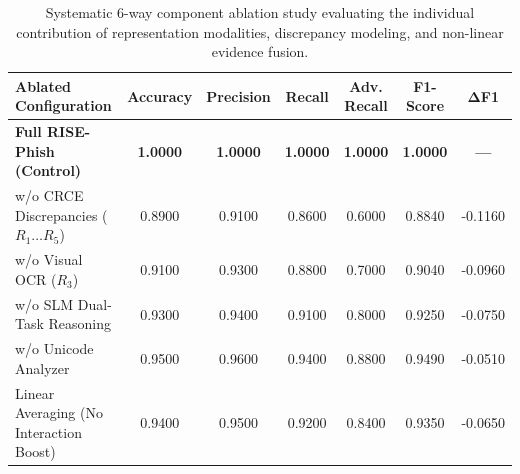\documentclass{article}
\begin{document}
\begin{table}[t]
\centering
\small
\caption{Systematic 6-way component ablation study evaluating the individual contribution of representation modalities, discrepancy modeling, and non-linear evidence fusion.}
\label{tab:ablation_study}
\begin{tabular}{lcccccc}
\toprule
\textbf{Ablated Configuration} & \textbf{Accuracy} & \textbf{Precision} & \textbf{Recall} & \textbf{Adv. Recall} & \textbf{F1-Score} & $\boldsymbol{\Delta}$\textbf{F1} \\
\midrule
\textbf{Full RISE-Phish (Control)}  & \textbf{1.0000} & \textbf{1.0000} & \textbf{1.0000} & \textbf{1.0000} & \textbf{1.0000} & \textbf{---} \\
w/o CRCE Discrepancies ($R_1 \dots R_5$) & 0.8900 & 0.9100 & 0.8600 & 0.6000 & 0.8840 & -0.1160 \\
w/o Visual OCR ($R_3$)                   & 0.9100 & 0.9300 & 0.8800 & 0.7000 & 0.9040 & -0.0960 \\
w/o SLM Dual-Task Reasoning              & 0.9300 & 0.9400 & 0.9100 & 0.8000 & 0.9250 & -0.0750 \\
w/o Unicode Analyzer                     & 0.9500 & 0.9600 & 0.9400 & 0.8800 & 0.9490 & -0.0510 \\
Linear Averaging (No Interaction Boost)  & 0.9400 & 0.9500 & 0.9200 & 0.8400 & 0.9350 & -0.0650 \\
\bottomrule
\end{tabular}
\end{table}
\end{document}
